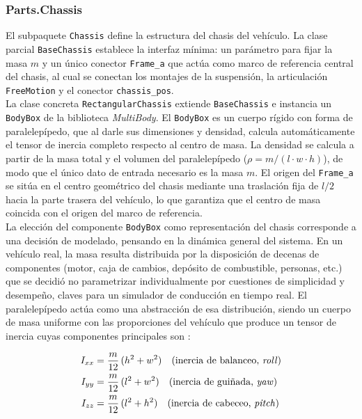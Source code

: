 \newpage

\subsubsection*{Parts.Chassis}

El subpaquete \verb|Chassis| define la estructura del chasis del vehículo. La clase parcial \verb|BaseChassis| establece la interfaz mínima: un parámetro para fijar la masa $m$ y un único conector \verb|Frame_a| que actúa como marco de referencia central del chasis, al cual se conectan los montajes de la suspensión, la articulación \verb|FreeMotion| y el conector \verb|chassis_pos|.\\

La clase concreta \verb|RectangularChassis| extiende \verb|BaseChassis| e instancia un \verb|BodyBox| de la biblioteca \textit{MultiBody}. El \verb|BodyBox| es un cuerpo rígido con forma de paralelepípedo, que al darle sus dimensiones y densidad, calcula automáticamente el tensor de inercia completo respecto al centro de masa. La densidad se calcula a partir de la masa total y el volumen del paralelepípedo  ($\rho = m / (l \cdot w \cdot h)$), de modo que el único dato de entrada necesario es la masa $m$. El origen del \verb|Frame_a| se sitúa en el centro geométrico del chasis mediante una traslación fija de $l/2$ hacia la parte trasera del vehículo, lo que garantiza que el centro de masa coincida con el origen del marco de referencia. \\

La elección del componente \verb|BodyBox| como representación del chasis corresponde a una decisión de modelado, pensando en la dinámica general del sistema. En un vehículo real, la masa resulta distribuida por la disposición de decenas de componentes (motor, caja de cambios, depósito de combustible, personas, etc.) que se decidió no parametrizar individualmente por cuestiones de simplicidad y desempeño, claves para un simulador de conducción en tiempo real. El paralelepípedo actúa como una abstracción de esa distribución, siendo un cuerpo de masa uniforme con las proporciones del vehículo que produce un tensor de inercia cuyas componentes principales son \cite{meriam2012}: 

\begin{align}
    I_{xx} &= \frac{m}{12}\,(h^2 + w^2) \quad \text{(inercia de balanceo, \textit{roll})} \\
    I_{yy} &= \frac{m}{12}\,(l^2 + w^2) \quad \text{(inercia de guiñada, \textit{yaw})} \\
    I_{zz} &= \frac{m}{12}\,(l^2 + h^2) \quad \text{(inercia de cabeceo, \textit{pitch})}
\end{align}

